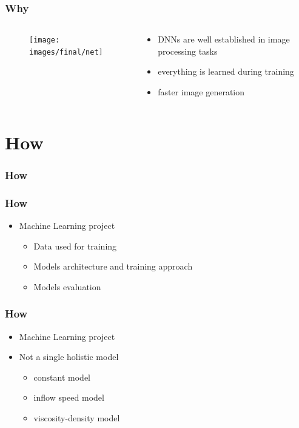 \documentclass[18pt, xcolor=table]{beamer}
\begin{document}
\begin{frame}
  \frametitle{Why}

  \begin{columns}[t]
    \begin{column}{0.5\textwidth}

      \vspace{-0.5cm}
      \begin{center}
        \begin{figure}[htb]
          \texttt{[image: images/final/net]}
        \end{figure}
      \end{center}

    \end{column}
    \begin{column}{0.5\textwidth}
      \begin{itemize}
      \item DNNs are well established in image processing tasks
      \item everything is learned during training
      \item faster image generation
      \end{itemize}
    \end{column}
  \end{columns}
\end{frame}


\section{How}

\begin{frame}[t]
  \frametitle{How}
\end{frame}

\begin{frame}[t]
  \frametitle{How}
  \begin{itemize}
  \item Machine Learning project
    \begin{itemize}
    \item Data used for training
    \item Models architecture and training approach
    \item Models evaluation
    \end{itemize}
  \end{itemize}
\end{frame}

\begin{frame}[t]
  \frametitle{How}
  \begin{itemize}
  \item Machine Learning project
  \item Not a single holistic model
  \begin{itemize}
    \item constant model
    \item inflow speed model
    \item viscosity-density model
    \end{itemize}
  \end{itemize}
\end{frame}
\end{document}
